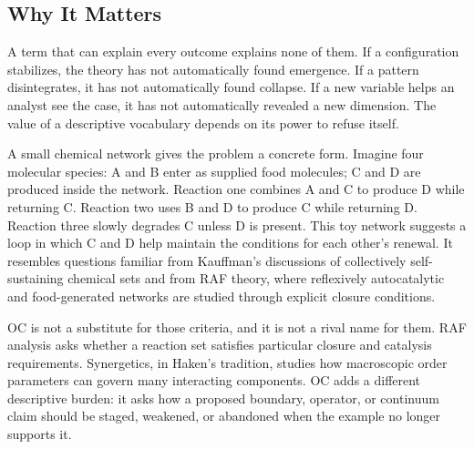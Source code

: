 \documentclass[11pt,a4paper,openany]{book}
\begin{document}
\subsection{Why It Matters}
A term that can explain every outcome explains none of them. If a configuration stabilizes, the theory has not automatically found emergence. If a pattern disintegrates, it has not automatically found collapse. If a new variable helps an analyst see the case, it has not automatically revealed a new dimension. The value of a descriptive vocabulary depends on its power to refuse itself. \cite{haken_synergetics,nicolis_prigogine_selforg}\par
A small chemical network gives the problem a concrete form. Imagine four molecular species: A and B enter as supplied food molecules; C and D are produced inside the network. Reaction one combines A and C to produce D while returning C. Reaction two uses B and D to produce C while returning D. Reaction three slowly degrades C unless D is present. This toy network suggests a loop in which C and D help maintain the conditions for each other's renewal. It resembles questions familiar from Kauffman's discussions of collectively self-sustaining chemical sets and from RAF theory, where reflexively autocatalytic and food-generated networks are studied through explicit closure conditions.\par
OC is not a substitute for those criteria, and it is not a rival name for them. RAF analysis asks whether a reaction set satisfies particular closure and catalysis requirements. Synergetics, in Haken's tradition, studies how macroscopic order parameters can govern many interacting components. OC adds a different descriptive burden: it asks how a proposed boundary, operator, or continuum claim should be staged, weakened, or abandoned when the example no longer supports it.\par
\end{document}
